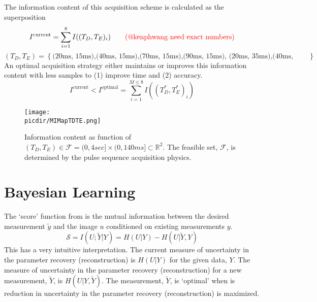 \documentclass{article}         %
\theoremstyle{definition}
\theoremstyle{remark}
\newcommand{\picdir}{pdffig/}
\begin{document}
The information content of this acquisition scheme is calculated as the superposition
\[
 I^\text{current} = \sum_{i=1}^8 I((T_D, T_E)_i)
\qquad \text{\color{red}(@kenphwang need exact numbers)}
\]
\[
   \left(T_D, T_E\right) = 
   \left\{
   \text{(20ms, 15ms),(40ms, 15ms),(70ms, 15ms),(90ms, 15ms),
         (20ms, 35ms),(40ms, 35ms),(70ms, 35ms),(90ms, 35ms)}
   \right\}
\]
An optimal acquisition strategy either maintains or improves this information content with
less samples to (1) improve time and (2) accuracy.
\[
  I^\text{current} < I^\text{optimal} = \sum_{i=1}^{M \leq 8} I((T^*_D, T^*_E)_i)
\]

\begin{figure}[h] 
\centering
\texttt{[image: \\picdir/MIMapTDTE.png]} 
\caption{ 
Information content as function of $(T_D, T_E) \in \mathcal{F} = (0,4sec] \times (0,140ms] \subset \mathbb{R}^2 $.
The feasible set, $\mathcal{F} $, 
is determined by the pulse sequence acquisition physics.
}\label{fig:MIMapTDTE}
\end{figure}

\section{Bayesian Learning}

The `score' function from 
\cite{seeger2010optimization} is the mutual information between the desired measurement $\tilde{y}$
and the image $u$ conditioned on existing measurements $y$.
\[ 
\mathcal{S}   =  I(U;\tilde{Y}|Y) =  H(U|Y) - H(U|\tilde{Y},Y)   
\]
This has a very intuitive interpretation.  The current measure of uncertainty
in the parameter recovery (reconstruction) is $H(U|Y)$ for the given data, $Y$. 
The measure of uncertainty in the parameter recovery (reconstruction) for
 a new measurement, $\tilde{Y}$, is $H(U|Y,\tilde{Y})$.
The measurement, $\tilde{Y}$, is `optimal' when is reduction
in uncertainty in the parameter recovery (reconstruction) is maximized.
\end{document}
